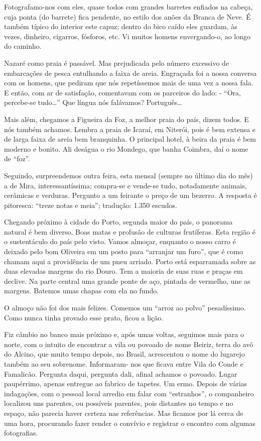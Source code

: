 Fotografamo-nos com eles, quase todos com grandes barretes enfiados na cabeça, cuja ponta (do barrete) fica pendente, no estilo dos anões da Branca de Neve. É também típico do interior este capuz; dentro do bico caído eles guardam, às vezes, dinheiro, cigarros, fósforos, etc. Vi muitos homens envergando-o, ao longo do caminho.

Nazaré como praia é passável. Mas prejudicada pelo número excessivo de embarcações de pesca entulhando a faixa de areia. Engraçada foi a nossa conversa com os homens, que pediram que nós repetíssemos mais de uma vez a nossa fala. E então, com ar de satisfação, comentavam com os parceiros do lado: - ``Ora, percebe-se tudo\ldots'' Que língua nós falávamos? Português\ldots

Mais além, chegamos a Figueira da Foz, a melhor praia do país, dizem todos. E nós também achamos. Lembra a praia de Icaraí, em Niterói, pois é bem extensa e de larga faixa de areia bem branquinha. O principal hotel, à beira da praia é bem moderno e bonito. Ali deságua o rio Mondego, que banha Coimbra, daí o nome de ``foz''.

Seguindo, surpreendemos outra feira, esta mensal (sempre no último dia do mês) a de Mira, interessantíssima; compra-se e vende-se tudo, notadamente animais, cerâmicas e verduras. Pergunto a um feirante o preço de um bezerro. A resposta é pitoresca: ``treze notas e meia''; tradução: 1.350 escudos.

Chegando próximo à cidade do Porto, segunda maior do país, o panorama natural é bem diverso. Boas matas e profusão de culturas frutíferas. Esta região é o sustentáculo do país pelo visto. Vamos almoçar, enquanto o nosso carro é deixado pelo bom Oliveira em um posto para ``arranjar um furo'', que é como chamam aqui a providência de um pneu arriado. Porto está esparramada sobre as duas elevadas margens do rio Douro. Tem a maioria de suas ruas e praças em declive. Na parte central uma grande ponte de aço, pintada de vermelho, une as margens. Batemos umas chapas com ela no fundo.

O almoço não foi dos mais felizes. Comemos um ``arroz ao polvo'' pesadíssimo. Como nunca tinha provado esse prato, ficou a lição.

Fiz câmbio no banco mais próximo e, após umas voltas, seguimos mais para o norte, com o intuito de encontrar a vila ou povoado de nome Beiriz, terra do avô do Alcino, que muito tempo depois, no Brasil, acrescentou o nome do lugarejo também ao seu sobrenome. Informaram- nos que ficava entre Vila do Conde e Famalicão. Pergunta daqui, pergunta dali, afinal achamos o povoado. Lugar paupérrimo, apenas entregue ao fabrico de tapetes. Um ermo. Depois de várias indagações, com o pessoal local arredio em falar com ``estranhos'', o companheiro localizou uns parentes, ou possíveis parentes, pois distantes no tempo e no espaço, não parecia haver certeza nas referências. Mas ficamos por lá cerca de uma hora, procurando fazer render o convívio e registrar o encontro com algumas fotografias.

